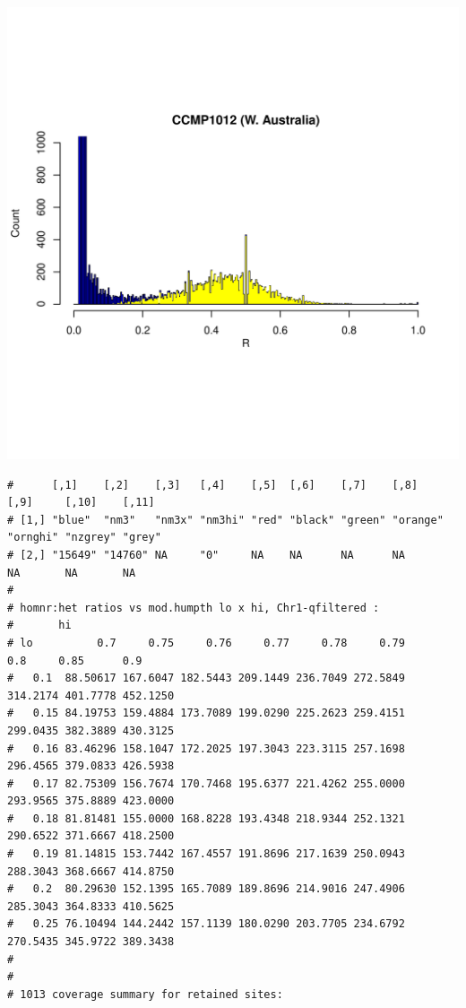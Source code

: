 \documentclass{article}\usepackage[]{graphicx}\usepackage[]{color}
\makeatletter
\def\maxwidth{ %
  \ifdim\Gin@nat@width>\linewidth
    \linewidth
  \else
    \Gin@nat@width
  \fi
}
\newenvironment{kframe}{%
 \def\at@end@of@kframe{}%
 \ifinner\ifhmode%
  \def\at@end@of@kframe{\end{minipage}}%
  \begin{minipage}{\columnwidth}%
 \fi\fi%
 \def\FrameCommand##1{\hskip\@totalleftmargin \hskip-\fboxsep
 \colorbox{shadecolor}{##1}\hskip-\fboxsep
     \hskip-\linewidth \hskip-\@totalleftmargin \hskip\columnwidth}%
 \MakeFramed {\advance\hsize-\width
   \@totalleftmargin\z@ \linewidth\hsize
   \@setminipage}}%
 {\par\unskip\endMakeFramed%
 \at@end@of@kframe}
\newenvironment{knitrout}{}{} %
\makeatother
\begin{document}
\begin{knitrout}
\includegraphics[width=\maxwidth]{FigS7-hwe-histo-figs-knitr/unnamed-chunk-10-45} 
\begin{kframe}\begin{verbatim}
#      [,1]    [,2]    [,3]   [,4]    [,5]  [,6]    [,7]    [,8]     [,9]     [,10]    [,11] 
# [1,] "blue"  "nm3"   "nm3x" "nm3hi" "red" "black" "green" "orange" "ornghi" "nzgrey" "grey"
# [2,] "15649" "14760" NA     "0"     NA    NA      NA      NA       NA       NA       NA
# 
# homnr:het ratios vs mod.humpth lo x hi, Chr1-qfiltered :
#       hi
# lo          0.7     0.75     0.76     0.77     0.78     0.79      0.8     0.85      0.9
#   0.1  88.50617 167.6047 182.5443 209.1449 236.7049 272.5849 314.2174 401.7778 452.1250
#   0.15 84.19753 159.4884 173.7089 199.0290 225.2623 259.4151 299.0435 382.3889 430.3125
#   0.16 83.46296 158.1047 172.2025 197.3043 223.3115 257.1698 296.4565 379.0833 426.5938
#   0.17 82.75309 156.7674 170.7468 195.6377 221.4262 255.0000 293.9565 375.8889 423.0000
#   0.18 81.81481 155.0000 168.8228 193.4348 218.9344 252.1321 290.6522 371.6667 418.2500
#   0.19 81.14815 153.7442 167.4557 191.8696 217.1639 250.0943 288.3043 368.6667 414.8750
#   0.2  80.29630 152.1395 165.7089 189.8696 214.9016 247.4906 285.3043 364.8333 410.5625
#   0.25 76.10494 144.2442 157.1139 180.0290 203.7705 234.6792 270.5435 345.9722 389.3438
# 
# 
# 1013 coverage summary for retained sites:

\end{verbatim}
\end{kframe}
\end{knitrout}
\end{document}
